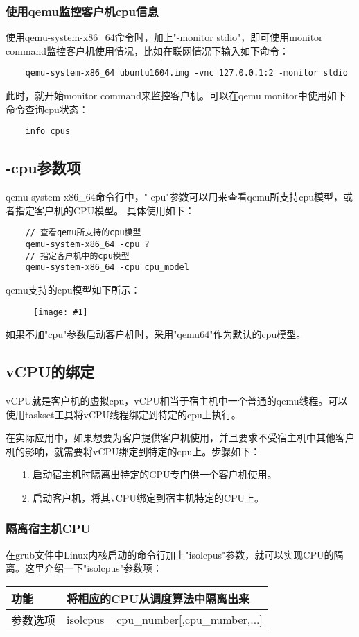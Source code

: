 \documentclass[a4paper,left=2.5cm,right=2.5cm,11pt]{article}
\newcommand{\fic}[1]{\begin{figure}[H]
		\center
		\texttt{[image: \#1]}
	\end{figure}}
\newcommand{\interval}{\vspace{0.5em}}
\newcommand{\tablestart}{
 	\interval
 	\begin{longtable}{p{2cm}p{10cm}}
 	\hline}
\newcommand{\tableend}{
 	\hline
 	\end{longtable}
 	\interval}
\begin{document}
\subsubsection{使用qemu监控客户机cpu信息}
	使用qemu-system-x86\_64命令时，加上"-monitor stdio"，即可使用monitor command监控客户机使用情况，比如在联网情况下输入如下命令：
	\begin{lstlisting}
	qemu-system-x86_64 ubuntu1604.img -vnc 127.0.0.1:2 -monitor stdio
	\end{lstlisting}

	此时，就开始monitor command来监控客户机。可以在qemu monitor中使用如下命令查询cpu状态：
	\begin{lstlisting}
	info cpus
	\end{lstlisting}

\subsection{-cpu参数项}
	qemu-system-x86\_64命令行中，"-cpu"参数可以用来查看qemu所支持cpu模型，或者指定客户机的CPU模型。
	具体使用如下：
	\begin{lstlisting}
	// 查看qemu所支持的cpu模型
	qemu-system-x86_64 -cpu ?
	// 指定客户机中的cpu模型
	qemu-system-x86_64 -cpu cpu_model
	\end{lstlisting}

	qemu支持的cpu模型如下所示：
	\fic{6.png}

	如果不加"cpu"参数启动客户机时，采用"qemu64"作为默认的cpu模型。

\subsection{vCPU的绑定}
	vCPU就是客户机的虚拟cpu，vCPU相当于宿主机中一个普通的qemu线程。可以使用taskset工具将vCPU线程绑定到特定的cpu上执行。\par
	在实际应用中，如果想要为客户提供客户机使用，并且要求不受宿主机中其他客户机的影响，就需要将vCPU绑定到特定的cpu上。步骤如下：
	\begin{itemize}
		\item[1.] 启动宿主机时隔离出特定的CPU专门供一个客户机使用。
		\item[2.] 启动客户机，将其vCPU绑定到宿主机特定的CPU上。
	\end{itemize}

\subsubsection{隔离宿主机CPU}
	在grub文件中Linux内核启动的命令行加上"isolcpus"参数，就可以实现CPU的隔离。这里介绍一下"isolcpus"参数项：
	\tablestart
	功能 & 将相应的CPU从调度算法中隔离出来\\
	\hline
	参数选项 & isolcpus= cpu\_number[,cpu\_number,...] \\
	\tableend
\end{document}
